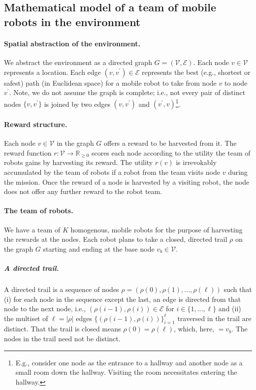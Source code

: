 \documentclass[11pt, oneside]{article}
\begin{document}
\subsection{Mathematical model of a team of mobile robots in the environment}
\paragraph{Spatial abstraction of the environment.}
We abstract the environment as a directed graph $G=(\mathcal{V}, \mathcal{E})$. Each node $v\in \mathcal{V}$ represents a location. Each edge $(v, v^\prime) \in \mathcal{E}$ represents the best (e.g., shortest or safest) path (in Euclidean space) for a mobile robot to take from node $v$ to node $v^\prime$. 
Note, we do not assume the graph is complete; i.e., not every pair of distinct nodes $\{v, v^\prime\}$ is joined by two edges $(v, v^\prime)$ and $(v^\prime, v)$\footnote{E.g., consider one node as the entrance to a hallway and another node as a small room down the hallway. Visiting the room necessitates entering the hallway.}.

\paragraph{Reward structure.}
Each node $v\in \mathcal{V}$ in the graph $G$ offers a reward to be harvested from it. 
The reward function $r: \mathcal{V} \rightarrow \mathbb{R}_{\geq 0}$ scores each node according to the utility the team of robots gains by harvesting its reward. The utility $r(v)$ is irrevokably accumulated by the team of robots if a robot from the team visits node $v$ during the mission.
Once the reward of a node is harvested by a visiting robot, the node does not offer any further reward to the robot team.

\paragraph{The team of robots.} 
We have a team of $K$ homogenous, mobile robots for the purpose of harvesting the rewards at the nodes. 
Each robot plans to take a closed, directed trail $\rho$ on the graph $G$ starting and ending at the base node $v_b \in \mathcal{V}$. 

\subparagraph{A directed trail.} A directed trail is a sequence of nodes $\rho=(\rho(0), \rho(1), ..., \rho(\ell))$ such that 
(i) for each node in the sequence except the last, an edge is directed from that node to the next node, i.e., $(\rho(i-1), \rho(i))\in\mathcal{E}$ for $i \in \{1, ..., \ell\}$
and 
(ii) the multiset of $\ell =\lvert \rho \rvert$ edges $\{(\rho(i-1), \rho(i))\}_{i=1}^{\ell}$ traversed in the trail are distinct.
That the trail is closed means $\rho(0)=\rho(\ell)$, which, here, $=v_b$.
The nodes in the trail need not be distinct.
 
\end{document}
